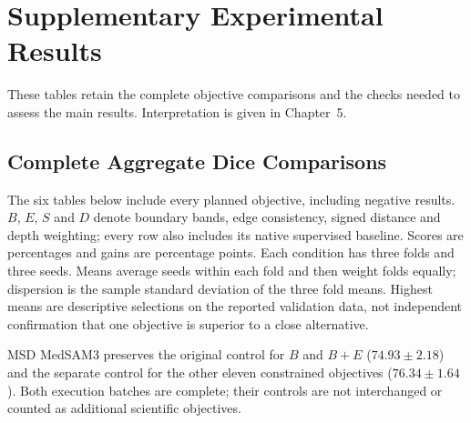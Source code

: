 \documentclass[12pt,a4paper]{article}
\begin{document}
\section{Supplementary Experimental Results}
\label{sec:extended-results}

These tables retain the complete objective comparisons and the checks
needed to assess the main results. Interpretation is given in Chapter~5.

\subsection{Complete Aggregate Dice Comparisons}
\label{sec:complete-result-tables}\label{sec:secondary-objective-results}

The six tables below include every planned objective, including negative
results. $B$, $E$, $S$ and $D$ denote boundary bands, edge consistency,
signed distance and depth weighting; every row also includes its native
supervised baseline. Scores are percentages and gains are percentage
points. Each condition has three folds and three seeds. Means average
seeds within each fold and then weight folds equally; dispersion is the
sample standard deviation of the three fold means. Highest means are
descriptive selections on the reported validation data, not independent
confirmation that one objective is superior to a close alternative.

MSD MedSAM3 preserves the original control for $B$ and $B+E$
($74.93\pm2.18$) and the separate control for the other eleven
constrained objectives ($76.34\pm1.64$). Both execution batches are
complete; their controls are not interchanged or counted as additional
scientific objectives.
\end{document}
